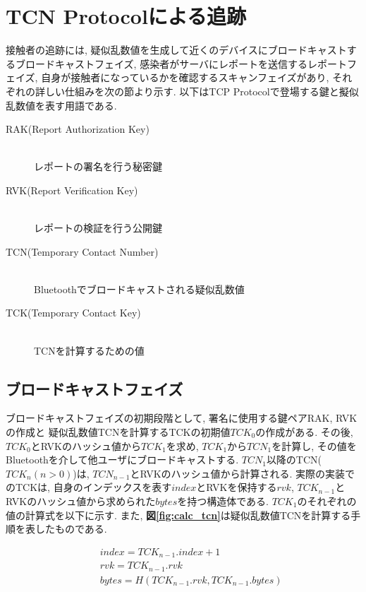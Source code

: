 \documentclass[twocolumn,10pt]{ltjsarticle}
\begin{document}
\section{TCN Protocolによる追跡}
接触者の追跡には, 疑似乱数値を生成して近くのデバイスにブロードキャストするブロードキャストフェイズ, 
感染者がサーバにレポートを送信するレポートフェイズ, 自身が接触者になっているかを確認するスキャンフェイズがあり, 
それぞれの詳しい仕組みを次の節より示す. 
以下はTCP Protocolで登場する鍵と擬似乱数値を表す用語である. 

\begin{description}
    \item[\textbullet RAK(Report Authorization Key)]~\\
    レポートの署名を行う秘密鍵
    \item[\textbullet RVK(Report Verification Key)]~\\
    レポートの検証を行う公開鍵
    \item[\textbullet TCN(Temporary Contact Number)]~\\
    Bluetoothでブロードキャストされる疑似乱数値
    \item[\textbullet TCK(Temporary Contact Key)]~\\
    TCNを計算するための値
\end{description}

\subsection{ブロードキャストフェイズ}
ブロードキャストフェイズの初期段階として, 署名に使用する鍵ペアRAK, RVKの作成と
疑似乱数値TCNを計算するTCKの初期値${TCK_0}$の作成がある. 
その後, ${TCK_0}$とRVKのハッシュ値から${TCK_1}$を求め, ${TCK_1}$から${TCN_1}$を計算し, 
その値をBluetoothを介して他ユーザにブロードキャストする. 
${TCN_1}$以降のTCN(${TCK_n (n > 0)}$)は, ${TCN_{n-1}}$とRVKのハッシュ値から計算される. 
実際の実装でのTCKは, 自身のインデックスを表す${index}$とRVKを保持する${rvk}$, 
${TCK_{n-1}}$とRVKのハッシュ値から求められた${bytes}$を持つ構造体である. 
${TCK_1}$のそれぞれの値の計算式を以下に示す. 
また, \textbf{図\ref{fig:calc_tcn}}は疑似乱数値TCNを計算する手順を表したものである. 

\begin{eqnarray*}
    && index = TCK_{n-1}.index + 1 \\
    && rvk = TCK_{n-1}.rvk \\
    && bytes = H(TCK_{n-1}.rvk, TCK_{n-1}.bytes)
\end{eqnarray*}
\end{document}
